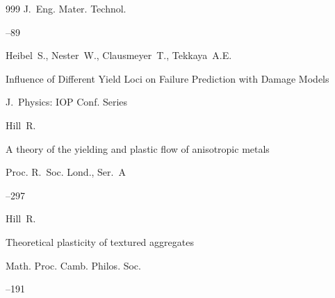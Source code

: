 \begin{thebibliography}{999}
\jour J.~Eng. Mater. Technol.  




--89






\by Heibel~S., Nester~W., Clausmeyer~T., Tekkaya~A.E. 

\paper Influence of Different Yield Loci on Failure Prediction with Damage Models

\jour J.~Physics: IOP Conf. Series









\by  Hill~R. 

\paper A theory of the yielding and plastic flow of anisotropic metals

\jour Proc. R.~Soc. Lond., Ser.~A




--297






\by Hill~R. 

\paper Theoretical plasticity of textured aggregates

\jour  Math. Proc. Camb. Philos. Soc.




--191








\end{thebibliography}
